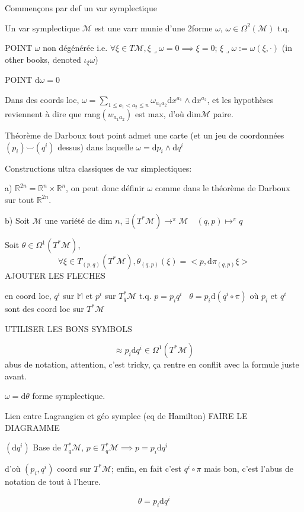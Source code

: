 \documentclass[a4paper,11pt]{article}
\renewcommand{\d}{{\mathrm{d}}}
\begin{document}
Commençons par def un var symplectique

Un var symplectique $\mathcal{M}$ est une varr munie d'une 2forme $\omega$, $\omega \in \Omega^2(\mathcal{M})$ t.q. 

POINT $\omega$ non dégénérée i.e. $\forall \xi\in T\mathcal{M}, \xi \lrcorner \omega = 0 \implies \xi =0$; \quad \quad $\xi \lrcorner \omega:= \omega(\xi,\cdot)$ (in other books, denoted $\iota_\xi \omega$)

POINT $\d \omega = 0$

Dans des coords loc, $\omega = \sum_{1\leq a_1 < a_2\leq n} \omega_{a_1a_2} \d x^{a_1} \wedge \d x^{a_2}$, et les hypothèses reviennent à dire que rang$(w_{a_1a_2})$ est max, d'où dim$\mathcal{M}$ paire.

Théorème de Darboux tout point admet une carte (et un jeu de coordonnées $(p_i)\!\!\smile\!\!(q^i)$ dessus) dans laquelle $\omega = \d p_i\wedge\d q^i$

Constructions ultra classiques de var simplectiques:

a) $\mathbb{R}^{2n}=\mathbb{R}^n\times\mathbb{R}^n$, on peut donc définir $\omega$ comme dans le théorème de Darboux sur tout $\mathbb{R}^{2n}$.

b) Soit $\mathcal{M}$ une variété de dim $n$, $\exists (T^*\mathcal{M})\to^\pi \mathcal{M} \quad (q,p) \mapsto^\pi q$

Soit $\theta \in \Omega^1 (T^*\mathcal{M})$,
$$\forall \xi \in T_{(p,q)}(T^*\mathcal{M}), \theta_{(q,p)}(\xi) = < p, \d \pi_{(q,p)} \xi >$$
AJOUTER LES FLECHES

en coord loc, $q^i$ sur $\mathbb{M}$ et $p^i$ sur $T_q^*\mathcal{M}$ t.q. $p = p_iq^i$ \, $\theta = p_i \d (q^i\circ \pi)$ où $p_i$ et $q^i$ sont des coord loc sur $T^*\mathcal{M}$

UTILISER LES BONS SYMBOLS

$$\approx p_i\d q^i\in \Omega^1(T^*\mathcal{M})$$
abus de notation, attention, c'est tricky, ça rentre en conflit avec la formule juste avant.

$\omega = \d \theta$ forme symplectique.

Lien entre Lagrangien et géo symplec (eq de Hamilton)
FAIRE LE DIAGRAMME

$(\d q^i)$ Base de $T_q^*\mathcal{M}$, $p\in T^*_q\mathcal{M} \implies p=p_i\d q^i$

d'où $(p_i, q^i)$ coord sur $T^*\mathcal{M}$; enfin, en fait c'est $q^i\circ \pi$ mais bon, c'est l'abus de notation de tout à l'heure.

$$\theta = p_i\d q^i$$
\end{document}
